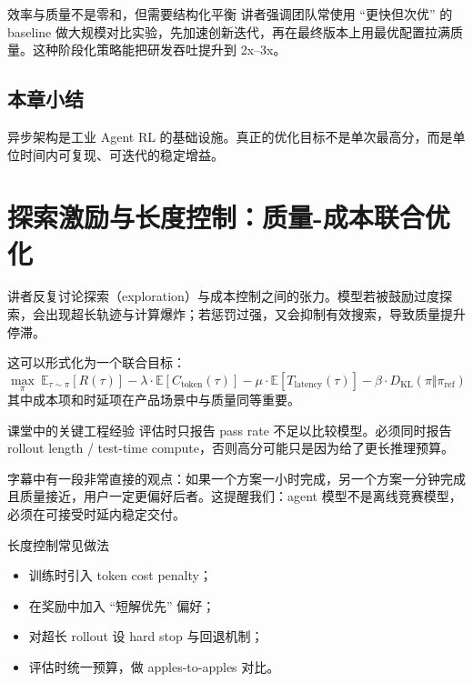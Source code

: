 \documentclass[a4paper]{article}
\begin{document}
\begin{importantbox}{效率与质量不是零和，但需要结构化平衡}
讲者强调团队常使用 ``更快但次优'' 的 baseline 做大规模对比实验，先加速创新迭代，再在最终版本上用最优配置拉满质量。这种阶段化策略能把研发吞吐提升到 2x--3x。
\end{importantbox}

\subsection{本章小结}
异步架构是工业 Agent RL 的基础设施。真正的优化目标不是单次最高分，而是单位时间内可复现、可迭代的稳定增益。

\section{探索激励与长度控制：质量-成本联合优化}

讲者反复讨论探索（exploration）与成本控制之间的张力。模型若被鼓励过度探索，会出现超长轨迹与计算爆炸；若惩罚过强，又会抑制有效搜索，导致质量提升停滞。

这可以形式化为一个联合目标：
\[
\max_{\pi} \ \mathbb{E}_{\tau \sim \pi}\left[R(\tau)\right]
- \lambda \cdot \mathbb{E}[C_{\text{token}}(\tau)]
- \mu \cdot \mathbb{E}[T_{\text{latency}}(\tau)]
- \beta \cdot D_{\mathrm{KL}}(\pi \Vert \pi_{\text{ref}})
\]
其中成本项和时延项在产品场景中与质量同等重要。

\begin{importantbox}{课堂中的关键工程经验}
评估时只报告 pass rate 不足以比较模型。必须同时报告 rollout length / test-time compute，否则高分可能只是因为给了更长推理预算。
\end{importantbox}

字幕中有一段非常直接的观点：如果一个方案一小时完成，另一个方案一分钟完成且质量接近，用户一定更偏好后者。这提醒我们：agent 模型不是离线竞赛模型，必须在可接受时延内稳定交付。

\begin{knowledgebox}{长度控制常见做法}
\begin{itemize}
    \item 训练时引入 token cost penalty；
    \item 在奖励中加入 ``短解优先'' 偏好；
    \item 对超长 rollout 设 hard stop 与回退机制；
    \item 评估时统一预算，做 apples-to-apples 对比。
\end{itemize}
\end{knowledgebox}
\end{document}
